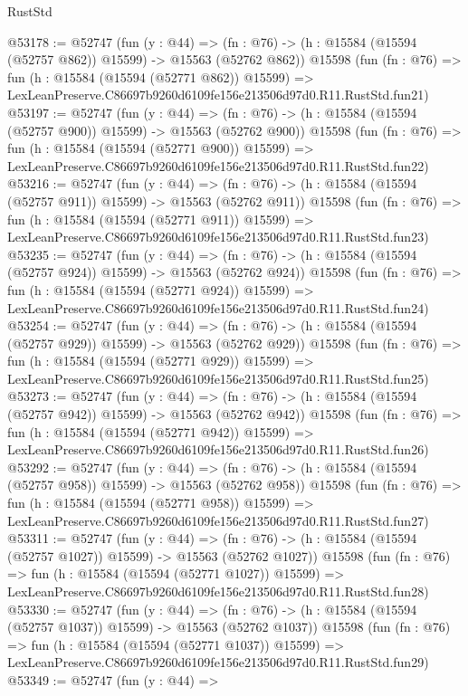\begin{lexlean}{RustStd}
\begin{coremodule}
@53178 := @52747
    (fun (y : @44) =>
    (fn : @76) -> (h : @15584 (@15594 (@52757 @862)) @15599) -> @15563 (@52762 @862))
    @15598
    (fun (fn : @76) =>
    fun (h : @15584 (@15594 (@52771 @862)) @15599) =>
    LexLeanPreserve.C86697b9260d6109fe156e213506d97d0.R11.RustStd.fun21)
@53197 := @52747
    (fun (y : @44) =>
    (fn : @76) -> (h : @15584 (@15594 (@52757 @900)) @15599) -> @15563 (@52762 @900))
    @15598
    (fun (fn : @76) =>
    fun (h : @15584 (@15594 (@52771 @900)) @15599) =>
    LexLeanPreserve.C86697b9260d6109fe156e213506d97d0.R11.RustStd.fun22)
@53216 := @52747
    (fun (y : @44) =>
    (fn : @76) -> (h : @15584 (@15594 (@52757 @911)) @15599) -> @15563 (@52762 @911))
    @15598
    (fun (fn : @76) =>
    fun (h : @15584 (@15594 (@52771 @911)) @15599) =>
    LexLeanPreserve.C86697b9260d6109fe156e213506d97d0.R11.RustStd.fun23)
@53235 := @52747
    (fun (y : @44) =>
    (fn : @76) -> (h : @15584 (@15594 (@52757 @924)) @15599) -> @15563 (@52762 @924))
    @15598
    (fun (fn : @76) =>
    fun (h : @15584 (@15594 (@52771 @924)) @15599) =>
    LexLeanPreserve.C86697b9260d6109fe156e213506d97d0.R11.RustStd.fun24)
@53254 := @52747
    (fun (y : @44) =>
    (fn : @76) -> (h : @15584 (@15594 (@52757 @929)) @15599) -> @15563 (@52762 @929))
    @15598
    (fun (fn : @76) =>
    fun (h : @15584 (@15594 (@52771 @929)) @15599) =>
    LexLeanPreserve.C86697b9260d6109fe156e213506d97d0.R11.RustStd.fun25)
@53273 := @52747
    (fun (y : @44) =>
    (fn : @76) -> (h : @15584 (@15594 (@52757 @942)) @15599) -> @15563 (@52762 @942))
    @15598
    (fun (fn : @76) =>
    fun (h : @15584 (@15594 (@52771 @942)) @15599) =>
    LexLeanPreserve.C86697b9260d6109fe156e213506d97d0.R11.RustStd.fun26)
@53292 := @52747
    (fun (y : @44) =>
    (fn : @76) -> (h : @15584 (@15594 (@52757 @958)) @15599) -> @15563 (@52762 @958))
    @15598
    (fun (fn : @76) =>
    fun (h : @15584 (@15594 (@52771 @958)) @15599) =>
    LexLeanPreserve.C86697b9260d6109fe156e213506d97d0.R11.RustStd.fun27)
@53311 := @52747
    (fun (y : @44) =>
    (fn : @76) -> (h : @15584 (@15594 (@52757 @1027)) @15599) -> @15563 (@52762 @1027))
    @15598
    (fun (fn : @76) =>
    fun (h : @15584 (@15594 (@52771 @1027)) @15599) =>
    LexLeanPreserve.C86697b9260d6109fe156e213506d97d0.R11.RustStd.fun28)
@53330 := @52747
    (fun (y : @44) =>
    (fn : @76) -> (h : @15584 (@15594 (@52757 @1037)) @15599) -> @15563 (@52762 @1037))
    @15598
    (fun (fn : @76) =>
    fun (h : @15584 (@15594 (@52771 @1037)) @15599) =>
    LexLeanPreserve.C86697b9260d6109fe156e213506d97d0.R11.RustStd.fun29)
@53349 := @52747
    (fun (y : @44) =>

\end{coremodule}
\end{lexlean}
